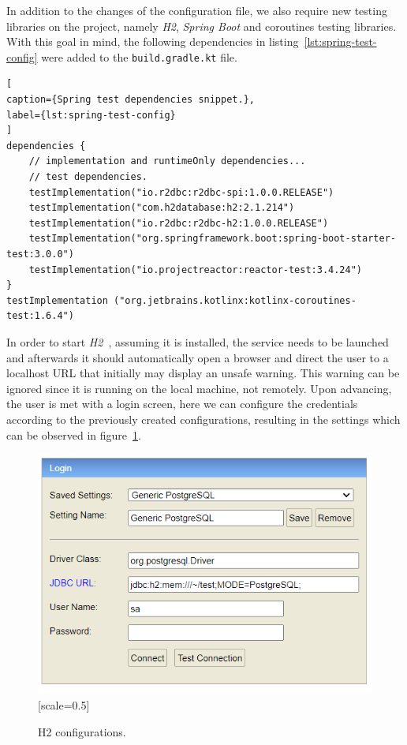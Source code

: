 In addition to the changes of the configuration file, we also require new testing libraries on the project, namely \textit{H2}, \textit{Spring Boot} and coroutines testing libraries. With this goal in mind, the following dependencies in listing~\ref{lst:spring-test-config} were added to the \lstinline{build.gradle.kt} file.

\begin{lstlisting}[
caption={Spring test dependencies snippet.},
label={lst:spring-test-config}
]
dependencies {
    // implementation and runtimeOnly dependencies...
    // test dependencies.
    testImplementation("io.r2dbc:r2dbc-spi:1.0.0.RELEASE")
    testImplementation("com.h2database:h2:2.1.214")
    testImplementation("io.r2dbc:r2dbc-h2:1.0.0.RELEASE")
    testImplementation("org.springframework.boot:spring-boot-starter-test:3.0.0")
    testImplementation("io.projectreactor:reactor-test:3.4.24")
}
testImplementation ("org.jetbrains.kotlinx:kotlinx-coroutines-test:1.6.4")
\end{lstlisting}

In order to start \textit{H2}~\cite{h2-db}, assuming it is installed, the service needs to be launched and afterwards it should automatically open a browser and direct the user to a localhost URL that initially may display an unsafe warning. This warning can be ignored since it is running on the local machine, not remotely. Upon advancing, the user is met with a login screen, here we can configure the credentials according to the previously created configurations, resulting in the settings which can be observed in figure~\ref{fig:h2-login-config}.

\begin{figure}[H]
    \centering
    \includegraphics{Chapters/img/misc/h2-login-config.png}[scale=0.5]
    \caption{H2 configurations.}
    \label{fig:h2-login-config}
\end{figure}

